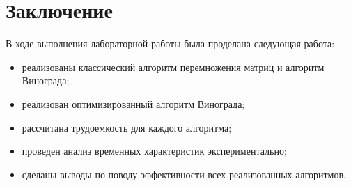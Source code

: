 \chapter*{Заключение}

В ходе выполнения лабораторной работы была проделана следующая работа:

\begin{itemize}
    \item реализованы классический алгоритм перемножения матриц и алгоритм Винограда;
    \item реализован оптимизированный алгоритм Винограда;
	\item рассчитана трудоемкость для каждого алгоритма;
	\item проведен анализ временных характеристик экспериментально;
	\item сделаны выводы по поводу эффективности всех реализованных алгоритмов.
\end{itemize}
